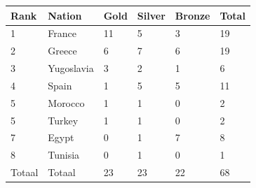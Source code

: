 \documentclass{article}
\begin{document}
\begin{tabular}{llllll}
\toprule
Rank & Nation & Gold & Silver & Bronze & Total \\
\midrule
1 & France & 11 & 5 & 3 & 19 \\
2 & Greece & 6 & 7 & 6 & 19 \\
3 & Yugoslavia & 3 & 2 & 1 & 6 \\
4 & Spain & 1 & 5 & 5 & 11 \\
5 & Morocco & 1 & 1 & 0 & 2 \\
5 & Turkey & 1 & 1 & 0 & 2 \\
7 & Egypt & 0 & 1 & 7 & 8 \\
8 & Tunisia & 0 & 1 & 0 & 1 \\
Totaal & Totaal & 23 & 23 & 22 & 68 \\
\bottomrule
\end{tabular}
\end{document}
